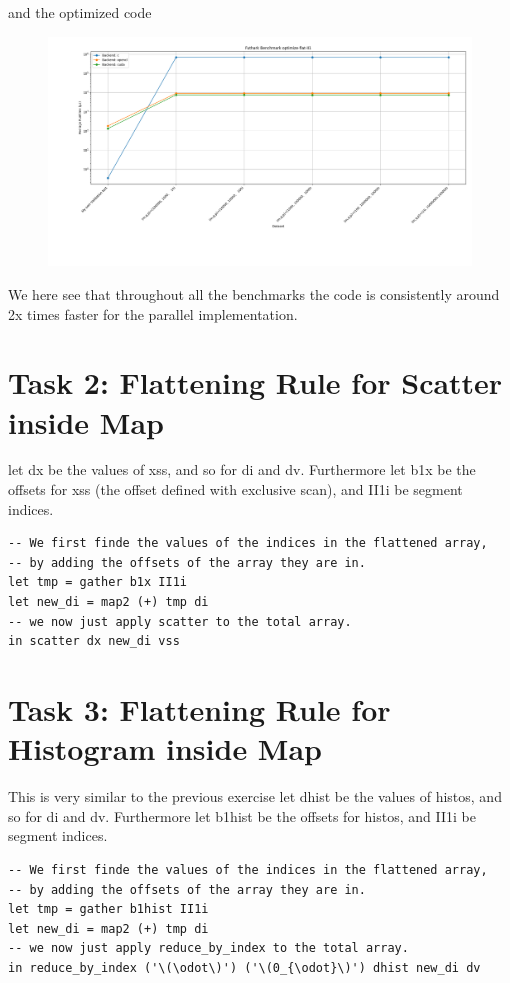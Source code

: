 \documentclass[a4paper,12pt]{article}
\begin{document}
and the optimized code
\begin{figure}[H]
  \centering
  \includegraphics[width=\linewidth]{optimize.png}
\end{figure}
We here see that throughout all the benchmarks the code is consistently
around 2x times faster for the parallel implementation.
\section*{Task 2: Flattening Rule for Scatter inside Map }
let dx be the values of xss, and so for di and dv.
Furthermore let b1x be the offsets for xss (the offset defined with
exclusive scan), and II1i be segment indices.
\begin{lstlisting}
-- We first finde the values of the indices in the flattened array,
-- by adding the offsets of the array they are in.
let tmp = gather b1x II1i
let new_di = map2 (+) tmp di
-- we now just apply scatter to the total array.
in scatter dx new_di vss
\end{lstlisting}
\section*{Task 3: Flattening Rule for Histogram inside Map}
This is very similar to the previous exercise
let dhist be the values of histos, and so for di and dv.
Furthermore let b1hist be the offsets for histos, and II1i be segment indices.
\begin{lstlisting}[escapeinside='']
-- We first finde the values of the indices in the flattened array,
-- by adding the offsets of the array they are in.
let tmp = gather b1hist II1i
let new_di = map2 (+) tmp di
-- we now just apply reduce_by_index to the total array.
in reduce_by_index ('\(\odot\)') ('\(0_{\odot}\)') dhist new_di dv
\end{lstlisting}
\end{document}
